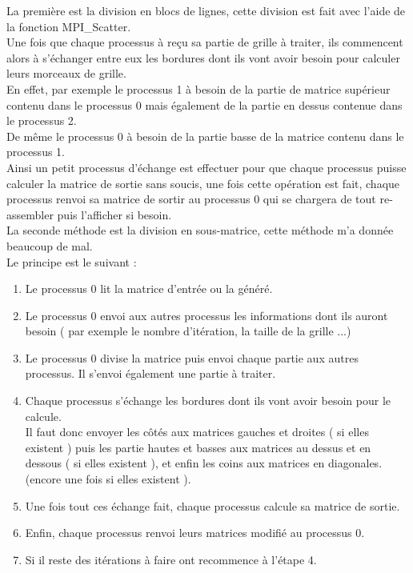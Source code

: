 \documentclass[10pt,a4paper]{article}
\begin{document}
La première est la division en blocs de lignes, cette division est fait avec l'aide de la fonction MPI\_Scatter. \\
Une fois que chaque processus à reçu sa partie de grille à traiter, ils commencent alors à s'échanger entre eux les bordures dont ils vont avoir besoin pour calculer leurs morceaux de grille. \\
En effet, par exemple le processus 1 à besoin de la partie de matrice supérieur contenu dans le processus 0 mais également de la partie en dessus contenue dans le processus 2. \\
De même le processus 0 à besoin de la partie basse de la matrice contenu dans le processus 1. \\

Ainsi un petit processus d'échange est effectuer pour que chaque processus puisse calculer la matrice de sortie sans soucis, une fois cette opération est fait, chaque processus renvoi sa matrice de sortir au processus 0 qui se chargera de tout re-assembler puis l'afficher si besoin. \\

La seconde méthode est la division en sous-matrice, cette méthode m'a donnée beaucoup de mal. \\
Le principe est le suivant : \\
\begin{enumerate}[(1)]
  \item Le processus 0 lit la matrice d'entrée ou la généré.
  \item Le processus 0 envoi aux autres processus les informations dont ils auront besoin ( par exemple le nombre d'itération, la taille de la grille ...)
  \item Le processus 0 divise la matrice puis envoi chaque partie aux autres processus. Il s'envoi également une partie à traiter.
  \item Chaque processus s'échange les bordures dont ils vont avoir besoin pour le calcule. \\
  Il faut donc envoyer les côtés aux matrices gauches et droites ( si elles existent ) puis les partie hautes et basses aux matrices au dessus et en dessous ( si elles existent ), et enfin les coins aux matrices en diagonales. (encore une fois si elles existent ).
  \item Une fois tout ces échange fait, chaque processus calcule sa matrice de sortie.
  \item Enfin, chaque processus renvoi leurs matrices modifié au processus 0.
  \item Si il reste des itérations à faire ont recommence à l'étape 4.
\end{enumerate}
\end{document}
